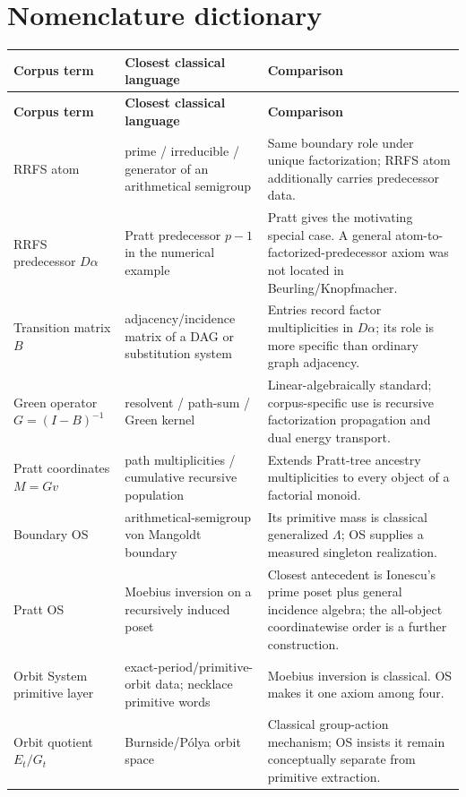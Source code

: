 \documentclass[11pt]{article}
\begin{document}
\section{Nomenclature dictionary}
\small
\begin{longtable}{>{\raggedright\arraybackslash}p{}>{\raggedright\arraybackslash}p{}>{\raggedright\arraybackslash}p{}}
\toprule
\textbf{Corpus term} & \textbf{Closest classical language} & \textbf{Comparison}\\
\midrule
\endfirsthead
\toprule
\textbf{Corpus term} & \textbf{Closest classical language} & \textbf{Comparison}\\
\midrule
\endhead
RRFS atom & prime / irreducible / generator of an arithmetical semigroup & Same boundary role under unique factorization; RRFS atom additionally carries predecessor data.\\
RRFS predecessor $D\alpha$ & Pratt predecessor $p-1$ in the numerical example & Pratt gives the motivating special case. A general atom-to-factorized-predecessor axiom was not located in Beurling/Knopfmacher.\\
Transition matrix $B$ & adjacency/incidence matrix of a DAG or substitution system & Entries record factor multiplicities in $D\alpha$; its role is more specific than ordinary graph adjacency.\\
Green operator $G=(I-B)^{-1}$ & resolvent / path-sum / Green kernel & Linear-algebraically standard; corpus-specific use is recursive factorization propagation and dual energy transport.\\
Pratt coordinates $M=Gv$ & path multiplicities / cumulative recursive population & Extends Pratt-tree ancestry multiplicities to every object of a factorial monoid.\\
Boundary OS & arithmetical-semigroup von Mangoldt boundary & Its primitive mass is classical generalized $\Lambda$; OS supplies a measured singleton realization.\\
Pratt OS & Moebius inversion on a recursively induced poset & Closest antecedent is Ionescu's prime poset plus general incidence algebra; the all-object coordinatewise order is a further construction.\\
Orbit System primitive layer & exact-period/primitive-orbit data; necklace primitive words & Moebius inversion is classical. OS makes it one axiom among four.\\
Orbit quotient $E_t/G_t$ & Burnside/P\'olya orbit space & Classical group-action mechanism; OS insists it remain conceptually separate from primitive extraction.\\

\end{longtable}
\end{document}
